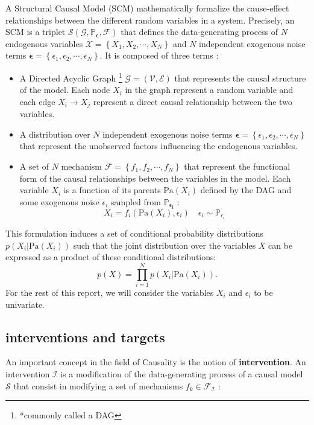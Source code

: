\documentclass{article}
\begin{document}
A Structural Causal Model (SCM) mathematically formalize the cause-effect
relationships between the different random variables in a system. Precisely, an
SCM is a triplet $\mathcal{S}(\mathcal{G},\mathbb{P}_{\boldsymbol{\epsilon}},
    \mathcal{F})$ that defines the data-generating process of $N$ endogenous
variables $\mathcal{X} = \left\{ X_1, X_2, \cdots, X_N \right\}$ and $N$
independent exogenous noise terms $\boldsymbol{\epsilon} = \left\{ \epsilon_1,
    \epsilon_2, \cdots, \epsilon_N \right\}$. It is composed of three terms :
\begin{itemize}
    \item A Directed Acyclic Graph \footnote{*commonly called a DAG} $\mathcal{G} =
              \left( \mathcal{V}, \mathcal{E} \right)$ that represents the causal structure
          of the model. Each node $X_i$ in the graph represent a random variable and each
          edge $X_i \rightarrow X_j$ represent a direct causal relationship between the
          two variables.
    \item A distribution over $N$ independent exogenous noise terms
          $\boldsymbol{\epsilon} = \left\{ \epsilon_1, \epsilon_2, \cdots, \epsilon_N
              \right\}$ that represent the unobserved factors influencing the endogenous
          variables.
    \item A set of $N$ mechanism $\mathcal{F} = \left\{ f_1, f_2, \cdots, f_N \right\}$
          that represent the functional form of the causal relationships between the
          variables in the model. Each variable $X_i$ is a function of its parents
          $\text{Pa}(X_i)$ defined by the DAG and some exogenous noise $\epsilon_i$
          sampled from $\mathbb{P}_{\boldsymbol{\epsilon_i}}$ :
          \begin{equation}
              X_i  = f_i(\text{Pa}(X_i), \epsilon_i)  \quad \epsilon_i \sim \mathbb{P}_{\epsilon_i}
          \end{equation}
\end{itemize}

This formulation induces a set of conditional probability distributions $p(X_i
    | \text{Pa}(X_i))$ such that the joint distribution over the variables $X$ can
be expressed as a product of these conditional distributions: $$p(X) = \prod_{i
        = 1}^N p(X_i | \text{Pa}(X_i)).$$ For the rest of this report, we will consider
the variables $X_i$ and $\epsilon_i$ to be univariate.

\subsection{interventions and targets}
An important concept in the field of Causality is the notion of
\textbf{intervention}. An intervention $\mathcal{I}$ is a modification of the
data-generating process of a causal model $\mathcal{S}$ that consist in
modifying a set of mechanisms $f_k \in \mathcal{F}_{\mathcal{I}}$ :
\end{document}

